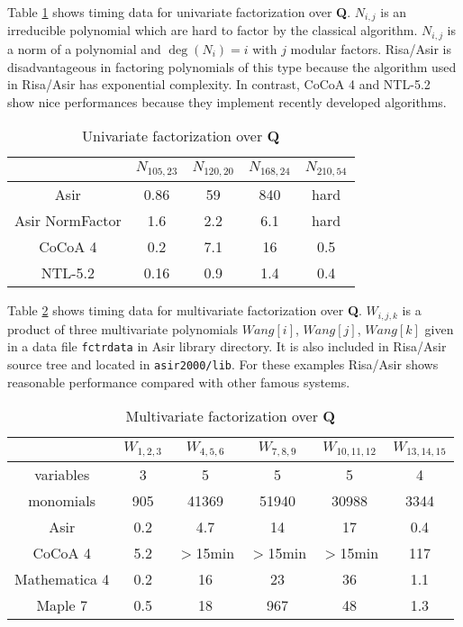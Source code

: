 \documentclass[runningheads]{cl2emult}
\begin{document}
Table \ref{unifac} shows timing data for univariate factorization over
{\bf Q}.  $N_{i,j}$ is an irreducible polynomial which are hard to
factor by the classical algorithm. $N_{i,j}$ is a norm of a polynomial
and $\deg(N_i) = i$ with $j$ modular factors. Risa/Asir is
disadvantageous in factoring polynomials of this type because the
algorithm used in Risa/Asir has exponential complexity. In contrast,
CoCoA 4\cite{COCOA} and NTL-5.2\cite{NTL} show nice performances
because they implement recently developed algorithms.

\begin{table}[hbtp]
\begin{center}
\begin{tabular}{|c||c|c|c|c|} \hline
		& $N_{105,23}$ & $N_{120,20}$ & $N_{168,24}$ & $N_{210,54}$ \\ \hline
Asir 	& 0.86	& 59 & 840 & hard \\ \hline
Asir NormFactor & 1.6 	& 2.2& 6.1& hard \\ \hline
CoCoA 4 & 0.2 	& 7.1	& 16 & 0.5 \\ \hline\hline
NTL-5.2	& 0.16 	& 0.9 	& 1.4 & 0.4 \\ \hline
\end{tabular}
\end{center}
\caption{Univariate factorization over {\bf Q}}
\label{unifac}
\end{table}

Table \ref{multifac} shows timing data for multivariate
factorization over {\bf Q}.
$W_{i,j,k}$ is a product of three multivariate polynomials 
$Wang[i]$, $Wang[j]$, $Wang[k]$ given in a data file
{\tt fctrdata} in Asir library directory. It is also included
in Risa/Asir source tree and located in {\tt asir2000/lib}.
For these examples Risa/Asir shows reasonable performance
compared with other famous systems. 

\begin{table}[hbtp]
\begin{center}
\begin{tabular}{|c||c|c|c|c|c|} \hline
	& $W_{1,2,3}$ & $W_{4,5,6}$ & $W_{7,8,9}$ & $W_{10,11,12}$ & $W_{13,14,15}$ \\ \hline
variables & 3 & 5 & 5 & 5 & 4 \\ \hline
monomials & 905 & 41369 & 51940 & 30988 & 3344 \\ \hline\hline
Asir 	& 0.2 & 4.7 & 14 & 17 & 0.4 \\ \hline
CoCoA 4 & 5.2 & $>$15min 	& $>$15min & $>$15min & 117 \\ \hline\hline
Mathematica 4& 0.2 	& 16 	& 23 & 36 & 1.1 \\ \hline
Maple 7& 0.5 	& 18 	& 967  & 48 & 1.3 \\ \hline
\end{tabular}
\end{center}
\caption{Multivariate factorization over {\bf Q}}
\label{multifac}
\end{table}
\end{document}
